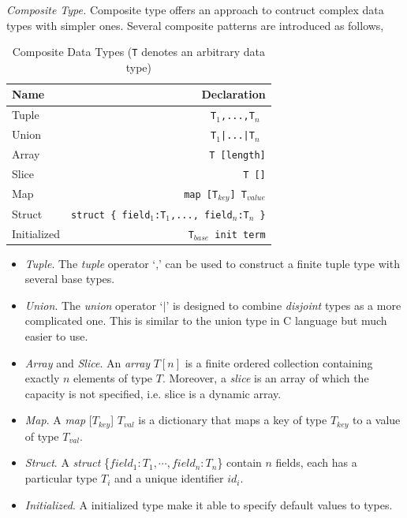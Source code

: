 \noindent\emph{Composite Type.} Composite type offers an approach to contruct complex data types with simpler ones. Several composite patterns are introduced as follows,

\begin{table}
    \caption{Composite Data Types (\texttt{T} denotes an arbitrary data type)}
    \centering
    \begin{tabular}{lr}
        \hline
        Name & Declaration \T\B \\
        \hline
        \T Tuple  & \texttt{T$_1$,...,T$_n$ }\\
        Union & \texttt{T$_1$|...|T$_n$ } \\
        Array & \texttt{T [length]}\\
        Slice & \texttt{T []} \\
        Map & \texttt{map [T$_{key}$] T$_{value}$} \\
        Struct\hspace{1cm} & \texttt{struct \{ field$_1$:T$_1$,..., field$_n$:T$_n$ \}} \\
        \B Initialized & \texttt{T$_{base}$ init term} \\
        \hline
    \end{tabular}
\end{table}

\begin{itemize}
    \item \emph{Tuple}. The \emph{tuple} operator `,' can be used to construct a finite tuple type with several base types.
    \item \emph{Union}. The \emph{union} operator `$|$' is designed to combine \emph{disjoint} types as a more complicated one. This is similar to the union type in C language but much easier to use.
    \item \emph{Array} and \emph{Slice}. An \emph{array} $T[n]$ is a finite ordered collection containing exactly $n$ elements of type $T$. Moreover, a \emph{slice} is an array of which the capacity is not specified, i.e. slice is a dynamic array.
    \item \emph{Map}. A \emph{map }[$T_{key}$] $T_{val}$ is a dictionary that maps a key of type $T_{key}$ to a value of type $T_{val}$.
    \item \emph{Struct}. A \emph{struct }\{$field_1:T_1,\cdots,field_n:T_n$\} contain $n$ fields, each has a particular type $T_i$ and a unique identifier $id_i$.
    \item \emph{Initialized}. A initialized type make it able to specify default values to types.
\end{itemize}

